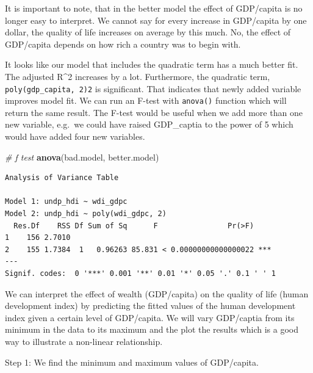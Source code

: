 \documentclass[]{article}
\newenvironment{Shaded}{\begin{snugshade}}{\end{snugshade}}
\newcommand{\KeywordTok}[1]{\textcolor[rgb]{0.13,0.29,0.53}{\textbf{#1}}}
\newcommand{\CommentTok}[1]{\textcolor[rgb]{0.56,0.35,0.01}{\textit{#1}}}
\newcommand{\OperatorTok}[1]{\textcolor[rgb]{0.81,0.36,0.00}{\textbf{#1}}}
\newcommand{\NormalTok}[1]{#1}
\theoremstyle{definition}
\theoremstyle{definition}
\theoremstyle{definition}
\theoremstyle{remark}
\begin{document}
It is important to note, that in the better model the effect of
GDP/capita is no longer easy to interpret. We cannot say for every
increase in GDP/capita by one dollar, the quality of life increases on
average by this much. No, the effect of GDP/capita depends on how rich a
country was to begin with.

It looks like our model that includes the quadratic term has a much
better fit. The adjusted R\^{}2 increases by a lot. Furthermore, the
quadratic term, \texttt{poly(gdp\_capita,\ 2)2} is significant. That
indicates that newly added variable improves model fit. We can run an
F-test with \texttt{anova()} function which will return the same result.
The F-test would be useful when we add more than one new variable,
e.g.~we could have raised GDP\_captia to the power of 5 which would have
added four new variables.

\begin{Shaded}
\begin{Highlighting}[]
\CommentTok{# f test}
\KeywordTok{anova}\NormalTok{(bad.model, better.model)}
\end{Highlighting}
\end{Shaded}

\begin{verbatim}
Analysis of Variance Table

Model 1: undp_hdi ~ wdi_gdpc
Model 2: undp_hdi ~ poly(wdi_gdpc, 2)
  Res.Df    RSS Df Sum of Sq      F                Pr(>F)    
1    156 2.7010                                              
2    155 1.7384  1   0.96263 85.831 < 0.00000000000000022 ***
---
Signif. codes:  0 '***' 0.001 '**' 0.01 '*' 0.05 '.' 0.1 ' ' 1
\end{verbatim}

We can interpret the effect of wealth (GDP/capita) on the quality of
life (human development index) by predicting the fitted values of the
human development index given a certain level of GDP/capita. We will
vary GDP/captia from its minimum in the data to its maximum and the plot
the results which is a good way to illustrate a non-linear relationship.

Step 1: We find the minimum and maximum values of GDP/capita.

\begin{Shaded}
\end{Shaded}
\end{document}
